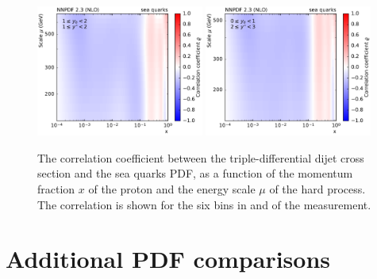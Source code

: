 \begin{figure}[htbp]
    \includegraphics[width=0.49\textwidth]{figures/pdf_constraints/corr_PTMAXEXPYS_YBYS_NLO_FINALBINS_NNPDF23_sea_quarks_ys1_0yb1_0_cl.pdf}\hfill
    \includegraphics[width=0.49\textwidth]{figures/pdf_constraints/corr_PTMAXEXPYS_YBYS_NLO_FINALBINS_NNPDF23_sea_quarks_ys2_0yb0_0_cl.pdf}\hfill
    \caption[Correlation between dijet cross section and sea quarks PDF]{
            The correlation coefficient between the triple-differential dijet cross
            section and the sea quarks PDF, as a function of the momentum fraction $x$ of the
            proton and the energy scale $\mu$ of the hard process. The correlation is shown
            for the six bins in \ystar and \yboost of the measurement.}
    \label{fig:pdfconstraints_sea_quarks}
\end{figure}

\section{Additional PDF comparisons}



